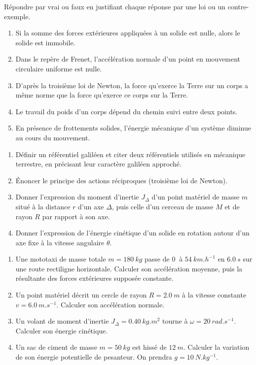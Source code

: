 \documentclass[11pt]{article}
\begin{document}
\begin{exercice}
Répondre par vrai ou faux en justifiant chaque réponse par une loi ou un contre-exemple.
\begin{enumerate}
\item Si la somme des forces extérieures appliquées à un solide est nulle, alors le solide est immobile.
\item Dans le repère de Frenet, l'accélération normale d'un point en mouvement circulaire uniforme est nulle.
\item D'après la troisième loi de Newton, la force qu'exerce la Terre sur un corps a même norme que la force qu'exerce ce corps sur la Terre.
\item Le travail du poids d'un corps dépend du chemin suivi entre deux points.
\item En présence de frottements solides, l'énergie mécanique d'un système diminue au cours du mouvement.
\end{enumerate}
\end{exercice}

\begin{exercice}
\begin{enumerate}
\item Définir un référentiel galiléen et citer deux référentiels utilisés en mécanique terrestre, en précisant leur caractère galiléen approché.
\item Énoncer le principe des actions réciproques (troisième loi de Newton).
\item Donner l'expression du moment d'inertie $J_\Delta$ d'un point matériel de masse $m$ situé à la distance $r$ d'un axe $\Delta$, puis celle d'un cerceau de masse $M$ et de rayon $R$ par rapport à son axe.
\item Donner l'expression de l'énergie cinétique d'un solide en rotation autour d'un axe fixe à la vitesse angulaire $\dot{\theta}$.
\end{enumerate}
\end{exercice}

\begin{exercice}
\begin{enumerate}
\item Une mototaxi de masse totale $m = \SI{180}{kg}$ passe de $\SI{0}{}$ à $\SI{54}{km.h^{-1}}$ en $\SI{6,0}{s}$ sur une route rectiligne horizontale. Calculer son accélération moyenne, puis la résultante des forces extérieures supposée constante.
\item Un point matériel décrit un cercle de rayon $R = \SI{2,0}{m}$ à la vitesse constante $v = \SI{6,0}{m.s^{-1}}$. Calculer son accélération normale.
\item Un volant de moment d'inertie $J_\Delta = \SI{0,40}{kg.m^2}$ tourne à $\omega = \SI{20}{rad.s^{-1}}$. Calculer son énergie cinétique.
\item Un sac de ciment de masse $m = \SI{50}{kg}$ est hissé de $\SI{12}{m}$. Calculer la variation de son énergie potentielle de pesanteur. On prendra $g = \SI{10}{N.kg^{-1}}$.
\end{enumerate}
\end{exercice}
\end{document}
